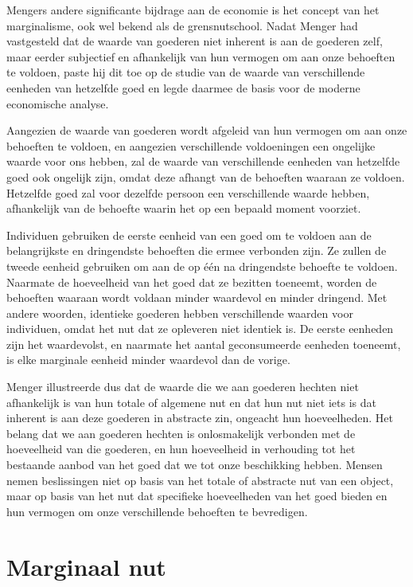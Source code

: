 Mengers andere significante bijdrage aan de economie is het concept van het marginalisme, ook wel bekend als de grensnutschool. Nadat Menger had vastgesteld dat de waarde van goederen niet inherent is aan de goederen zelf, maar eerder subjectief en afhankelijk van hun vermogen om aan onze behoeften te voldoen, paste hij dit toe op de studie van de waarde van verschillende eenheden van hetzelfde goed en legde daarmee de basis voor de moderne economische analyse. 

Aangezien de waarde van goederen wordt afgeleid van hun vermogen om aan onze behoeften te voldoen, en aangezien verschillende voldoeningen een ongelijke waarde voor ons hebben, zal de waarde van verschillende eenheden van hetzelfde goed ook ongelijk zijn, omdat deze afhangt van de behoeften waaraan ze voldoen. Hetzelfde goed zal voor dezelfde persoon een verschillende waarde hebben, afhankelijk van de behoefte waarin het op een bepaald moment voorziet.

Individuen gebruiken de eerste eenheid van een goed om te voldoen aan de belangrijkste en dringendste behoeften die ermee verbonden zijn. Ze zullen de tweede eenheid gebruiken om aan de op één na dringendste behoefte te voldoen. Naarmate de hoeveelheid van het goed dat ze bezitten toeneemt, worden de behoeften waaraan wordt voldaan minder waardevol en minder dringend. Met andere woorden, identieke goederen hebben verschillende waarden voor individuen, omdat het nut dat ze opleveren niet identiek is. De eerste eenheden zijn het waardevolst, en naarmate het aantal geconsumeerde eenheden toeneemt, is elke marginale eenheid minder waardevol dan de vorige.

Menger illustreerde dus dat de waarde die we aan goederen hechten niet afhankelijk is van hun totale of algemene nut en dat hun nut niet iets is dat inherent is aan deze goederen in abstracte zin, ongeacht hun hoeveelheden. Het belang dat we aan goederen hechten is onlosmakelijk verbonden met de hoeveelheid van die goederen, en hun hoeveelheid in verhouding tot het bestaande aanbod van het goed dat we tot onze beschikking hebben. Mensen nemen beslissingen niet op basis van het totale of abstracte nut van een object, maar op basis van het nut dat specifieke hoeveelheden van het goed bieden en hun vermogen om onze verschillende behoeften te bevredigen.

\section{Marginaal nut}

